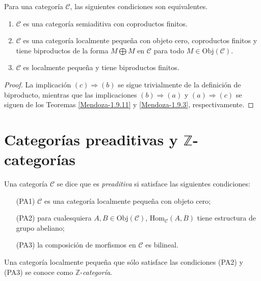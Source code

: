 \documentclass[tesis]{subfiles}
\begin{document}
\begin{Teo}\label{Mendoza-1.9.12}
    Para una categoría $\mathscr{C}$, las siguientes condiciones son equivalentes.

    \begin{enumerate}[label=(\alph*)]
    
        \item $\mathscr{C}$ es una categoría semiaditiva con coproductos finitos.

        \item $\mathscr{C}$ es una categoría localmente pequeña con objeto cero, coproductos finitos y tiene biproductos de la forma $M\bigoplus M$ en $\mathscr{C}$ para todo $M\in\text{Obj}(\mathscr{C})$.

        \item $\mathscr{C}$ es localmente pequeña y tiene biproductos finitos.
    \end{enumerate}
\end{Teo}

\begin{proof}
    La implicación $(c)\Rightarrow(b)$ se sigue trivialmente de la definición de biproducto, mientras que las implicaciones $(b)\Rightarrow(a)$ y $(a)\Rightarrow(c)$ se siguen de los Teoremas \ref{Mendoza-1.9.11} y \ref{Mendoza-1.9.3}, respectivamente.
\end{proof}

\section{Categorías preaditivas y $\mathbb{Z}$-categorías} \label{Sec: Categorías preaditivas y Z-categorías}

\begin{Def}\label{Def: Categoría preaditiva}
    Una categoría $\mathscr{C}$ se dice que es \emph{preaditiva} si satisface las siguientes condiciones:

    \begin{itemize}

        \item[(PA1)] $\mathscr{C}$ es una categoría localmente pequeña con objeto cero;

        \item [(PA2)] para cualesquiera $A,B\in\text{Obj}(\mathscr{C})$, $\text{Hom}_\mathscr{C}(A,B)$ tiene estructura de grupo abeliano;

        \item[(PA3)] la composición de morfismos en $\mathscr{C}$ es bilineal.
    \end{itemize}
    Una categoría localmente pequeña que sólo satisface las condiciones (PA2) y (PA3) se conoce como $\mathbb{Z}$-\emph{categoría}.
\end{Def}
\end{document}
